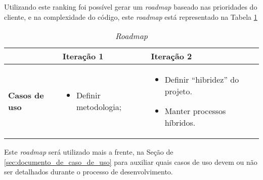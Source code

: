 Utilizando este ranking foi possível gerar um \textit{roadmap} baseado nas prioridades do cliente, e na complexidade do código, este \textit{roadmap} está representado na Tabela \ref{tab:primeiro_roadmap}  

\vspace{5mm}
\begin{table}[H]
\centering
\begin{tabular}{p{1cm}|p{6cm}|p{}|}

\cline{2-3} &
\textbf{Iteração 1} &
\textbf{Iteração 2}
\\ \hline
\multicolumn{1}{|p{1cm}|}{\textbf{Casos de uso}} &
\begin{itemize}
 	\item Definir metodologia;
\end{itemize} &
\begin{itemize}
	\item Definir ``hibridez'' do projeto.
 	\item Manter processos híbridos.
 \end{itemize} 
 \\ \hline
\end{tabular}
\caption{\textit{Roadmap}}
\label{tab:primeiro_roadmap}
\end{table}

Este \textit{roadmap} será utilizado mais a frente, na Seção de \ref{sec:documento_de_caso_de_uso} para auxiliar quais casos de uso devem ou não ser detalhados durante o processo de desenvolvimento.